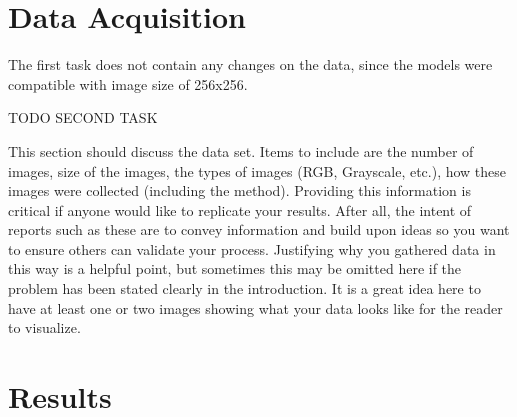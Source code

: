 \documentclass[10pt,journal,compsoc]{IEEEtran}
\begin{document}








\section{Data Acquisition}
The first task does not contain any changes on the data, since the models were compatible with image size of 256x256.

TODO SECOND TASK

This section should discuss the data set. Items to include are the number of images, size of the images, the types of images (RGB, Grayscale, etc.), how these images were collected (including the method). Providing this information is critical if anyone would like to replicate your results. After all, the intent of reports such as these are to convey information and build upon ideas so you want to ensure others can validate your process.
Justifying why you gathered data in this way is a helpful point, but sometimes this may be omitted here if the problem has been stated clearly in the introduction.
It is a great idea here to have at least one or two images showing what your data looks like for the reader to visualize.

\section{Results}
\end{document}
